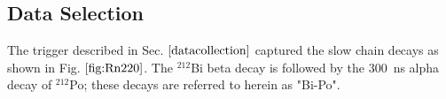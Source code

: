 


\subsection{Data Selection}
The trigger described in Sec. $\ref{datacollection}$ captured the slow chain decays as shown in Fig. $\ref{fig:Rn220}$. The $^{212}$Bi beta decay is followed by the 300~ns alpha decay of $^{212}$Po; these decays are referred to herein as "Bi-Po".



